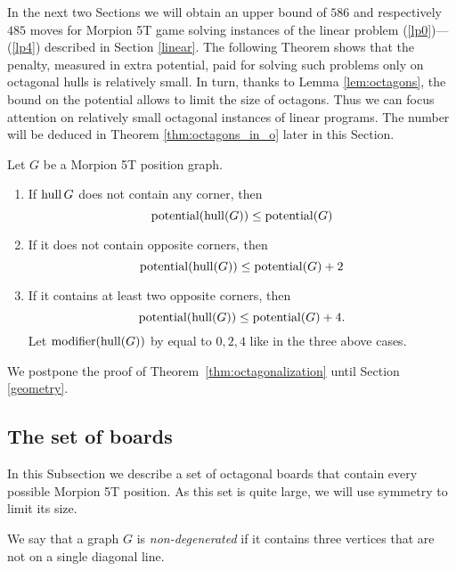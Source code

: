 
In the next two Sections we will obtain an upper bound of $586$ and respectively $485$ moves for Morpion 5T game solving \theoctagons instances of the linear problem (\ref{lp0})---(\ref{lp4}) described in Section \ref{linear}.  The following Theorem shows that the penalty, measured in extra potential, paid for solving such problems only on octagonal hulls is relatively small. In turn, thanks to Lemma \ref{lem:octagons}, the bound on the potential allows to limit the size of octagons. Thus we can focus attention on \theoctagons relatively small octagonal instances of linear programs. The number \theoctagons will be deduced in Theorem \ref{thm:octagons_in_o} later in this Section.

\begin{theorem}
\label{thm:octagonalization}
Let $G$ be a Morpion 5T position graph.
\begin{enumerate}
  \item  If $\operatorname{hull} G$ does not contain any corner, then
  \[
    \operatorname{potential}(\operatorname{hull}(G)) \leq \operatorname{potential}(G)
  \]
  \item If it does not contain opposite corners, then   \[
    \operatorname{potential}(\operatorname{hull}(G)) \leq \operatorname{potential}(G)+2
  \]
  \item If it contains at least two opposite corners, then
  \[\operatorname{potential}(\operatorname{hull}(G)) \leq \operatorname{potential}(G)+4.
 \]   
 Let $\operatorname{modifier}(\operatorname{hull}(G))$ by equal to $0,2,4$ like in the three above cases. 
\end{enumerate}
\end{theorem}

\noindent
We postpone the proof of Theorem~\ref{thm:octagonalization} until Section \ref{geometry}.

\subsection{The set of boards}

In this Subsection we describe a set of octagonal boards that contain every possible Morpion 5T position. As this set is  quite large, we will use symmetry to limit its size.




We say that a graph $G$ is \emph{non-degenerated} if it contains three vertices that are not on a single diagonal line.


